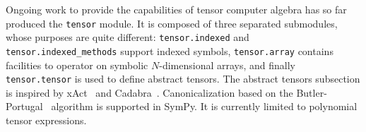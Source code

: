 Ongoing work to provide the capabilities of tensor computer algebra has so far
produced the \verb|tensor| module.  It is composed of three separated
submodules, whose purposes are quite different: \verb|tensor.indexed| and
\verb|tensor.indexed_methods| support indexed symbols,
\verb|tensor.array| contains facilities to operator on symbolic $N$-dimensional
arrays, and finally \verb|tensor.tensor| is used to define abstract tensors.
The abstract tensors subsection
is inspired by xAct~\cite{xAct} and Cadabra~\cite{Peeters2007cadabra}.
Canonicalization based on the Butler-Portugal~\cite{ManssurPortugal1999}
algorithm is supported in SymPy.  It is currently limited to polynomial tensor
expressions.
